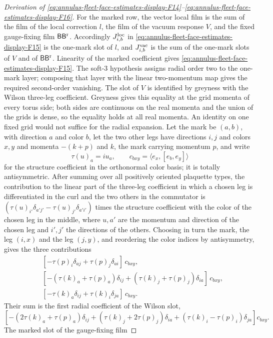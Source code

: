\begin{proof}[Derivation of \eqref{eq:annulus-fleet-face-estimates-display-F14}--\eqref{eq:annulus-fleet-face-estimates-display-F16}]
For the marked row, the vector local film is the sum of the film of
the local correction $l$, the film of the vacuum response $V$, and the
fixed gauge-fixing film $\mathsf B\mathsf B^{\rm r}$. Accordingly
$J^{\rm loc}_{i,b}$ in \eqref{eq:annulus-fleet-face-estimates-display-F15} is the one-mark slot of $l$, and
$J^{\rm vac}_{i,b}$ is the sum of the one-mark slots of $V$ and of
$\mathsf B\mathsf B^{\rm r}$. Linearity of the marked
coefficient gives \eqref{eq:annulus-fleet-face-estimates-display-F15}. The soft-3 hypothesis assigns radial order two
to the one-mark layer; composing that layer with the linear two-momentum
map gives the required second-order vanishing. The slot of $V$ is
identified by greyness with the Wilson three-leg coefficient. Greyness
gives this equality at the grid momenta of every torus side; both sides
are continuous on the real momenta and the union of the grids is dense,
so the equality holds at all real momenta. An identity on one fixed
grid would not suffice for the radial expansion. Let the mark be
$(a,b)$, with direction $a$ and color $b$, let the two other legs have
directions $i,j$ and colors $x,y$ and momenta $-(k+p)$ and $k$, the mark
carrying momentum $p$, and write
\[
 \tau(u)_a=iu_a,\qquad c_{bxy}=\langle e_x,[e_b,e_y]\rangle
\]
for the structure coefficient in the orthonormal color basis; it is
totally antisymmetric. After summing over all positively oriented plaquette types, the
contribution to the linear part of the three-leg coefficient in which a
chosen leg is differentiated in the curl and the two others in the
commutator is
$(\tau(u)_{i'}\delta_{a'j'}-\tau(u)_{j'}\delta_{a'i'})$ times the
structure coefficient with the color of the chosen leg in the middle,
where $u,a'$ are the momentum and direction of the chosen leg and
$i',j'$ the directions of the others. Choosing in turn the mark, the
leg $(i,x)$ and the leg $(j,y)$, and reordering the color indices by
antisymmetry, gives the three contributions
\[
\begin{aligned}
 &[-\tau(p)_i\delta_{aj}+\tau(p)_j\delta_{ai}]\,c_{bxy},\\
 &[-(\tau(k)_a+\tau(p)_a)\delta_{ij}
       +(\tau(k)_j+\tau(p)_j)\delta_{ia}]\,c_{bxy},\\
 &[-\tau(k)_a\delta_{ij}+\tau(k)_i\delta_{ja}]\,c_{bxy}.
\end{aligned}
\]
Their sum is the first radial coefficient of the Wilson slot,
\[
 [-(2\tau(k)_a+\tau(p)_a)\delta_{ij}
   +(\tau(k)_j+2\tau(p)_j)\delta_{ia}
   +(\tau(k)_i-\tau(p)_i)\delta_{ja}]c_{bxy}.
\]
The marked slot of the gauge-fixing film

\end{proof}

